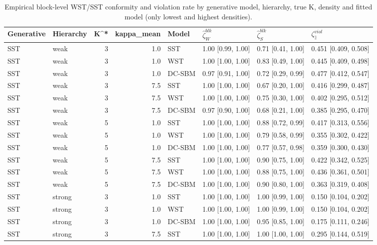 \begin{table}
\centering
\caption{Empirical block-level WST/SST conformity and violation rate by generative model, hierarchy, true K, density and fitted model (only lowest and highest densities).}
\centering
\begin{tabular}[t]{llrrllll}
\toprule
Generative & Hierarchy & K^* & kappa_mean & Model & $\widehat{\zeta}_W^{blk}$ & $\widehat{\zeta}_S^{blk}$ & $\zeta^{viol}_{\hat z}$\\
\midrule
SST & weak & 3 & 1.0 & SST & 1.00 [0.99, 1.00] & 0.71 [0.41, 1.00] & 0.451 [0.409, 0.508]\\
SST & weak & 3 & 1.0 & WST & 1.00 [1.00, 1.00] & 0.83 [0.49, 1.00] & 0.445 [0.409, 0.498]\\
SST & weak & 3 & 1.0 & DC-SBM & 0.97 [0.91, 1.00] & 0.72 [0.29, 0.99] & 0.477 [0.412, 0.547]\\
SST & weak & 3 & 7.5 & SST & 1.00 [1.00, 1.00] & 0.67 [0.20, 1.00] & 0.416 [0.299, 0.487]\\
SST & weak & 3 & 7.5 & WST & 1.00 [1.00, 1.00] & 0.75 [0.30, 1.00] & 0.402 [0.295, 0.512]\\
\addlinespace
SST & weak & 3 & 7.5 & DC-SBM & 0.97 [0.90, 1.00] & 0.68 [0.21, 1.00] & 0.385 [0.295, 0.470]\\
SST & weak & 5 & 1.0 & SST & 1.00 [1.00, 1.00] & 0.88 [0.72, 0.99] & 0.417 [0.313, 0.556]\\
SST & weak & 5 & 1.0 & WST & 1.00 [1.00, 1.00] & 0.79 [0.58, 0.99] & 0.355 [0.302, 0.422]\\
SST & weak & 5 & 1.0 & DC-SBM & 1.00 [1.00, 1.00] & 0.77 [0.57, 0.98] & 0.359 [0.300, 0.430]\\
SST & weak & 5 & 7.5 & SST & 1.00 [1.00, 1.00] & 0.90 [0.75, 1.00] & 0.422 [0.342, 0.525]\\
\addlinespace
SST & weak & 5 & 7.5 & WST & 1.00 [1.00, 1.00] & 0.88 [0.75, 1.00] & 0.436 [0.361, 0.501]\\
SST & weak & 5 & 7.5 & DC-SBM & 1.00 [1.00, 1.00] & 0.90 [0.80, 1.00] & 0.363 [0.319, 0.408]\\
SST & strong & 3 & 1.0 & SST & 1.00 [1.00, 1.00] & 1.00 [0.99, 1.00] & 0.150 [0.104, 0.202]\\
SST & strong & 3 & 1.0 & WST & 1.00 [1.00, 1.00] & 1.00 [0.99, 1.00] & 0.150 [0.104, 0.202]\\
SST & strong & 3 & 1.0 & DC-SBM & 1.00 [1.00, 1.00] & 0.95 [0.85, 1.00] & 0.175 [0.111, 0.246]\\
\addlinespace
SST & strong & 3 & 7.5 & SST & 1.00 [1.00, 1.00] & 1.00 [1.00, 1.00] & 0.295 [0.144, 0.519]\\

\end{tabular}
\end{table}
